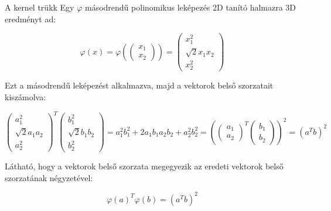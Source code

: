 \documentclass[english, aspectratio=169]{beamer}
\begin{document}
\begin{frame}{A kernel trükk}
Egy $\varphi$ másodrendű polinomikus leképezés 2D tanító halmazra 3D eredményt ad:
\begin{block}{}
\[
\varphi\left( x \right) = \varphi\left( \begin{pmatrix}
x_1 \\
x_2
\end{pmatrix} \right) = \begin{pmatrix}
x_1^2 \\
\sqrt{2} x_1 x_2 \\
x_2^2
\end{pmatrix}
\]
\end{block}
Ezt a másodrendű leképezést alkalmazva, majd a vektorok belső szorzatait kiszámolva:
\begin{block}{}
\vspace{-.5cm}
\[
\begin{pmatrix}
a_1^2 \\
\sqrt{2} a_1 a_2 \\
a_2^2
\end{pmatrix}^T \begin{pmatrix}
b_1^2 \\
\sqrt{2} b_1 b_2 \\
b_2^2
\end{pmatrix} = a_1^2 b_1^2 + 2 a_1 b_1 a_2 b_2 + a_2^2 b_2^2 = \left( \begin{pmatrix}
a_1 \\
a_2
\end{pmatrix}^T \begin{pmatrix}
b_1 \\
b_2
\end{pmatrix} \right)^2 = \left( a^T b \right)^2
\]
\end{block}
Látható, hogy a vektorok belső szorzata megegyezik az eredeti vektorok belső szorzatának négyzetével:
\begin{block}{}
\vspace{-.1cm}
\[
\varphi \left( a \right)^T \varphi \left( b \right) = \left( a^T b \right)^2
\]
\end{block}
\end{frame}
\end{document}
